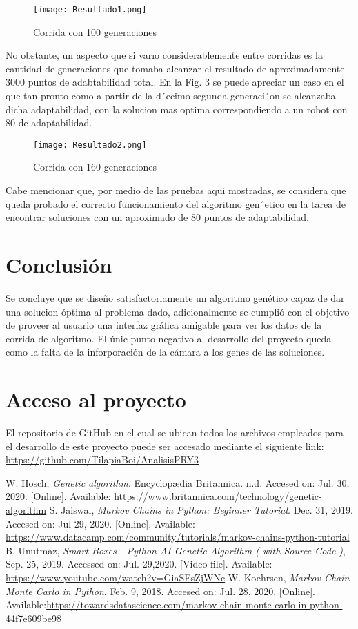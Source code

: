 \documentclass[conference]{IEEEtran}
\begin{document}
\begin{figure}[htbp]
\centerline{\texttt{[image: Resultado1.png]}}
\caption{Corrida con 100 generaciones}
\label{Imagen de referencia}
\end{figure}

No obstante, un aspecto que si varıo considerablemente entre corridas es la cantidad de generaciones que tomaba alcanzar el resultado de aproximadamente 3000 puntos de adabtabilidad total. En la Fig. 3 se puede apreciar un caso en el que tan pronto como a partir de la d´ecimo segunda generaci´on se alcanzaba dicha adaptabilidad, con la solucion mas optima correspondiendo a un robot con 80 de adaptabilidad.

\begin{figure}[htbp]
\centerline{\texttt{[image: Resultado2.png]}}
\caption{Corrida con 160 generaciones}
\label{50 muestras completo}
\end{figure}

Cabe mencionar que, por medio de las pruebas aqui mostradas, se considera que queda probado el correcto funcionamiento del algoritmo gen´etico en la tarea de encontrar soluciones con un aproximado de 80 puntos de adaptabilidad.

\section{Conclusión}

Se concluye que se diseño satisfactoriamente un algoritmo genético capaz de dar una solucion óptima al problema dado, adicionalmente se cumplió con el objetivo de proveer al usuario una interfaz gráfica amigable para ver los datos de  la corrida de algoritmo. El únic punto negativo al desarrollo del proyecto queda como la falta de la inforporación de la cámara a los genes de las soluciones.

\section{Acceso al proyecto}
El repositorio de GitHub en el cual se ubican todos los archivos empleados para el desarrollo de este proyecto puede ser accesado mediante el siguiente link: \url{https://github.com/TilapiaBoi/AnalisisPRY3}

\begin{thebibliography}{00}
 W. Hosch, \textit{Genetic algorithm}. Encyclopædia Britannica. n.d. Accesed on: Jul. 30, 2020. [Online]. Available: \url{https://www.britannica.com/technology/genetic-algorithm}
 S. Jaiswal, \textit{Markov Chains in Python: Beginner Tutorial}. Dec. 31, 2019. Accesed on: Jul 29, 2020. [Online]. Available: \url{https://www.datacamp.com/community/tutorials/markov-chains-python-tutorial}
 B. Unutmaz, \textit{Smart Boxes - Python AI Genetic Algorithm ( with Source Code )}, Sep. 25, 2019. Accessed on: Jul. 29,2020. [Video file]. Available: \url{ https://www.youtube.com/watch?v=GiaSEsZjWNc}
 W. Koehrsen, \textit{Markov Chain Monte Carlo in Python}. Feb. 9, 2018. Accesed on: Jul. 28, 2020. [Online]. Available:\url{https://towardsdatascience.com/markov-chain-monte-carlo-in-python-44f7e609be98}
\end{thebibliography}
\end{document}
